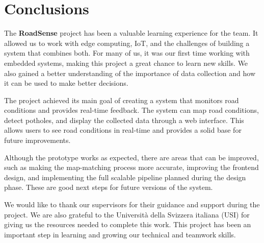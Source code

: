 \section{Conclusions}

The \textbf{RoadSense} project has been a valuable learning experience for the team. It allowed us to work with edge computing, IoT, and the challenges of building a system that combines both. For many of us, it was our first time working with embedded systems, making this project a great chance to learn new skills. We also gained a better understanding of the importance of data collection and how it can be used to make better decisions.

The project achieved its main goal of creating a system that monitors road conditions and provides real-time feedback. The system can map road conditions, detect potholes, and display the collected data through a web interface. This allows users to see road conditions in real-time and provides a solid base for future improvements.

Although the prototype works as expected, there are areas that can be improved, such as making the map-matching process more accurate, improving the frontend design, and implementing the full scalable pipeline planned during the design phase. These are good next steps for future versions of the system.

We would like to thank our supervisors for their guidance and support during the project. We are also grateful to the Università della Svizzera italiana (USI) for giving us the resources needed to complete this work. This project has been an important step in learning and growing our technical and teamwork skills.
